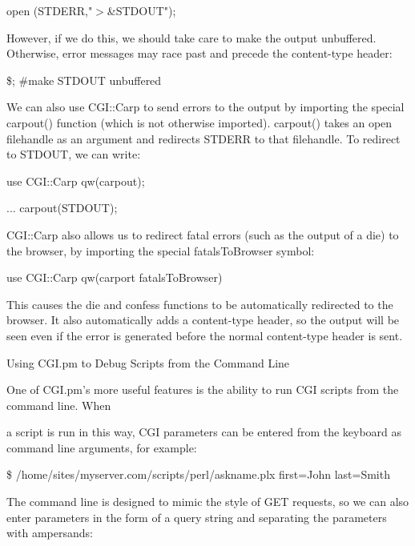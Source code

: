 \documentclass[a4paper,11pt]{book}
\begin{document}
\noindent open (STDERR,"$>$\&STDOUT");

\noindent 

\noindent However, if we do this, we should take care to make the output unbuffered. Otherwise, error messages may race past and precede the content-type header:

\noindent 

\noindent \$; \#make STDOUT unbuffered

\noindent 

\noindent We can also use CGI::Carp to send errors to the output by importing the special carpout() function (which is not otherwise imported). carpout() takes an open filehandle as an argument and redirects STDERR to that filehandle. To redirect to STDOUT, we can write:

\noindent 

\noindent use CGI::Carp qw(carpout);

\noindent ... carpout(STDOUT);

\noindent 

\noindent CGI::Carp also allows us to redirect fatal errors (such as the output of a die) to the browser, by importing the special fatalsToBrowser symbol:

\noindent 

\noindent use CGI::Carp qw(carport fatalsToBrowser)

\noindent 

\noindent This causes the die and confess functions to be automatically redirected to the browser. It also automatically adds a content-type header, so the output will be seen even if the error is generated before the normal content-type header is sent.

\noindent 

\noindent Using CGI.pm to Debug Scripts from the Command Line

\noindent 

\noindent One of CGI.pm's more useful features is the ability to run CGI scripts from the command line. When

\noindent a script is run in this way, CGI parameters can be entered from the keyboard as command line arguments, for example:

\noindent 

\noindent \$ /home/sites/myserver.com/scripts/perl/askname.plx first=John last=Smith

\noindent 

\noindent The command line is designed to mimic the style of GET requests, so we can also enter parameters in the form of a query string and separating the parameters with ampersands:
\end{document}
